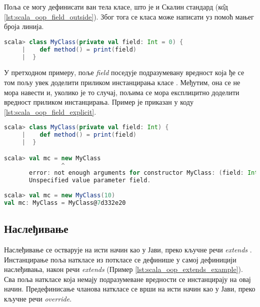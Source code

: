 \documentclass[12pt,oneside]{memoir}
\begin{document}

Поља се могу дефинисати ван тела класе, што је и Скалин стандард (к\^{о}д \ref{lst:scala_oop_field_outside}). Због тога се класа може написати уз помоћ мањег броја линија. 

\begin{lstlisting}[language=Scala, caption={Дефиниција поља ван тела класе}, label={lst:scala_oop_field_outside}, basicstyle=\small]
scala> class MyClass(private val field: Int = 0) {
     |    def method() = print(field)
     |  }

\end{lstlisting}


У претходном примеру, поље \textit{field} поседује подразумевану вредност која ђе се том пољу увек доделити приликом инстанцирања класе \cite{scala_prog}. Међутим, она се не мора навести и, уколико је то случај, пољима се мора експлицитно доделити вредност приликом инстанцирања. Пример је приказан у коду \ref{lst:scala_oop_field_explicit}.

\begin{lstlisting}[language=Scala, caption={Инстанцирање класе без подразумеваних вредности поља}, label={lst:scala_oop_field_explicit}, basicstyle=\small]
scala> class MyClass(private val field: Int) {
     |    def method() = print(field)
     |  }

scala> val mc = new MyClass
                ^
       error: not enough arguments for constructor MyClass: (field: Int): MyClass.
       Unspecified value parameter field.
     
scala> val mc = new MyClass(10)
val mc: MyClass = MyClass@7d332e20
\end{lstlisting}

\subsection{Наслеђивање}
\label{subsec:scala_nasled}

Наслеђивање се остварује на исти начин као у Јави, преко кључне речи \textit{extends} \cite{scala_prog}. Инстанцирање поља наткласе из поткласе се дефинише у самој дефиницији наслеђивања, након речи \textit{extends} (Пример \ref{lst:scala_oop_extends_example}). Сва поља наткласе која немају подразумеване вредности се инстанцирају на овај начин. Предефинисање чланова наткласе се врши на исти начин као у Јави, преко кључне речи \textit{override}.
\end{document}
